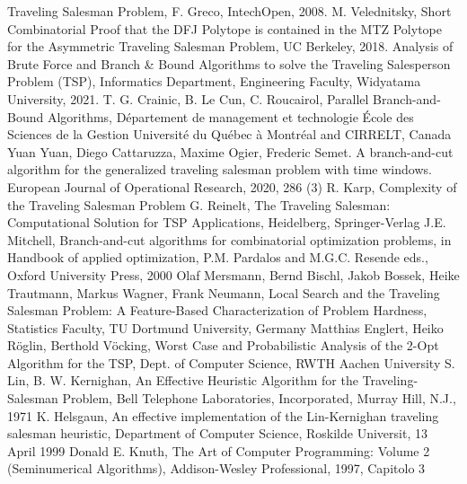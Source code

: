 \documentclass[a4paper,12pt]{report}
\begin{document}
\begin{thebibliography}{00}
Traveling Salesman Problem, F. Greco, IntechOpen, 2008.
M. Velednitsky, Short Combinatorial Proof that the DFJ Polytope is contained in
the MTZ Polytope for the Asymmetric Traveling Salesman Problem, UC Berkeley, 2018.
%
Analysis of Brute Force and Branch \& Bound Algorithms to solve the Traveling
Salesperson Problem (TSP), Informatics Department, Engineering Faculty, Widyatama University, 2021.
%
T. G. Crainic, B. Le Cun, C. Roucairol, Parallel Branch-and-Bound Algorithms, Département de management et technologie École des Sciences de la Gestion Université du Québec à Montréal and CIRRELT, Canada
Yuan Yuan, Diego Cattaruzza, Maxime Ogier, Frederic Semet. A branch-and-cut algorithm for the generalized traveling salesman problem with time windows. European Journal of Operational Research, 2020, 286 (3)
%
R. Karp, Complexity of the Traveling Salesman Problem
%
G. Reinelt, The Traveling Salesman: Computational Solution for TSP Applications, Heidelberg, Springer-Verlag
J.E. Mitchell, Branch-and-cut algorithms for combinatorial
optimization problems, in Handbook of applied optimization, P.M.
Pardalos and M.G.C. Resende eds., Oxford University Press, 2000
Olaf Mersmann, Bernd Bischl, Jakob Bossek, Heike Trautmann, Markus Wagner, Frank Neumann, Local Search and the Traveling Salesman Problem: A Feature-Based Characterization of Problem Hardness, Statistics Faculty, TU Dortmund University, Germany
Matthias Englert, Heiko Röglin, Berthold Vöcking, Worst Case and Probabilistic Analysis 
of the 2-Opt Algorithm for the TSP, Dept. of Computer Science, RWTH Aachen University
S. Lin, B. W. Kernighan, An Effective Heuristic Algorithm for the Traveling-
Salesman Problem, Bell Telephone Laboratories, Incorporated, Murray Hill, N.J., 1971
K. Helsgaun, An effective implementation of the Lin-Kernighan traveling
salesman heuristic, Department of Computer Science, Roskilde Universit, 13 April 1999
Donald E. Knuth, The Art of Computer Programming: Volume 2 (Seminumerical Algorithms), Addison-Wesley Professional, 1997, Capitolo 3


\end{thebibliography}
% 
\end{document}
